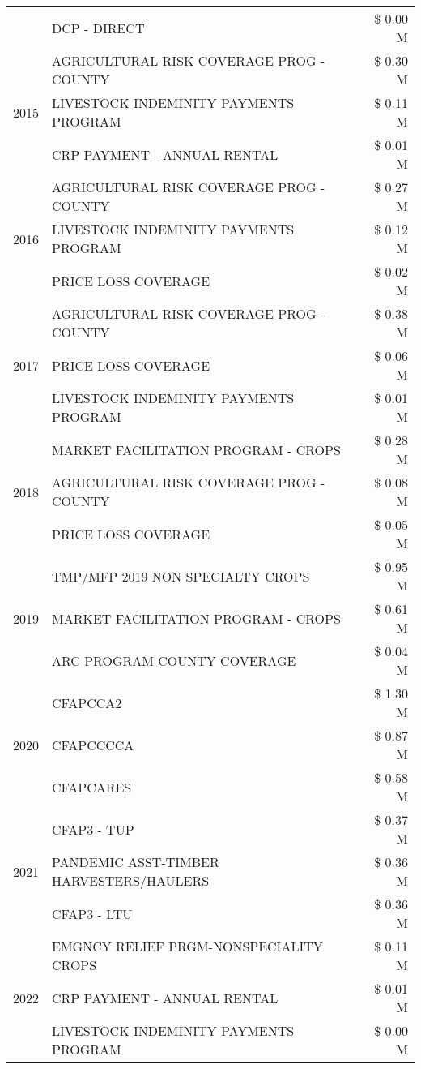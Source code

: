 \begin{tabular}{llr}
 & DCP - DIRECT & \$ 0.00 M \\
\cline{1-3}
\multirow[t]{3}{*}{2015} & AGRICULTURAL RISK COVERAGE PROG - COUNTY & \$ 0.30 M \\
 & LIVESTOCK INDEMINITY PAYMENTS PROGRAM & \$ 0.11 M \\
 & CRP PAYMENT - ANNUAL RENTAL & \$ 0.01 M \\
\cline{1-3}
\multirow[t]{3}{*}{2016} & AGRICULTURAL RISK COVERAGE PROG - COUNTY & \$ 0.27 M \\
 & LIVESTOCK INDEMINITY PAYMENTS PROGRAM & \$ 0.12 M \\
 & PRICE LOSS COVERAGE & \$ 0.02 M \\
\cline{1-3}
\multirow[t]{3}{*}{2017} & AGRICULTURAL RISK COVERAGE PROG - COUNTY & \$ 0.38 M \\
 & PRICE LOSS COVERAGE & \$ 0.06 M \\
 & LIVESTOCK INDEMINITY PAYMENTS PROGRAM & \$ 0.01 M \\
\cline{1-3}
\multirow[t]{3}{*}{2018} & MARKET FACILITATION PROGRAM - CROPS & \$ 0.28 M \\
 & AGRICULTURAL RISK COVERAGE PROG - COUNTY & \$ 0.08 M \\
 & PRICE LOSS COVERAGE & \$ 0.05 M \\
\cline{1-3}
\multirow[t]{3}{*}{2019} & TMP/MFP 2019 NON SPECIALTY CROPS & \$ 0.95 M \\
 & MARKET FACILITATION PROGRAM - CROPS & \$ 0.61 M \\
 & ARC PROGRAM-COUNTY COVERAGE & \$ 0.04 M \\
\cline{1-3}
\multirow[t]{3}{*}{2020} & CFAPCCA2 & \$ 1.30 M \\
 & CFAPCCCCA & \$ 0.87 M \\
 & CFAPCARES & \$ 0.58 M \\
\cline{1-3}
\multirow[t]{3}{*}{2021} & CFAP3 - TUP & \$ 0.37 M \\
 & PANDEMIC ASST-TIMBER HARVESTERS/HAULERS & \$ 0.36 M \\
 & CFAP3 - LTU & \$ 0.36 M \\
\cline{1-3}
\multirow[t]{3}{*}{2022} & EMGNCY RELIEF PRGM-NONSPECIALITY CROPS & \$ 0.11 M \\
 & CRP PAYMENT - ANNUAL RENTAL & \$ 0.01 M \\
 & LIVESTOCK INDEMINITY PAYMENTS PROGRAM & \$ 0.00 M \\
\cline{1-3}
\bottomrule
\end{tabular}
